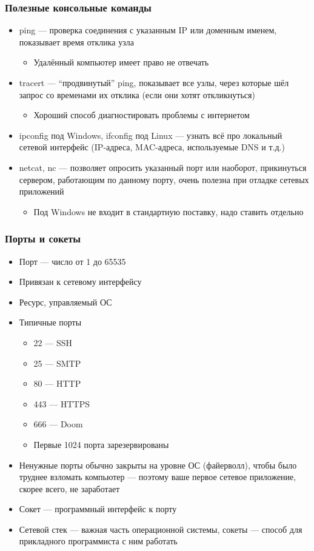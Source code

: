 \documentclass[xetex,mathserif,serif]{beamer}
\begin{document}
	\begin{frame}
		\frametitle{Полезные консольные команды}
		\begin{itemize}
			\item ping --- проверка соединения с указанным IP или доменным именем, показывает время отклика узла
			\begin{itemize}
				\item Удалённый компьютер имеет право не отвечать
			\end{itemize}
			\item tracert --- ``продвинутый'' ping, показывает все узлы, через которые шёл запрос со временами их отклика (если они хотят откликнуться)
			\begin{itemize}
				\item Хороший способ диагностировать проблемы с интернетом
			\end{itemize}
			\item ipconfig под Windows, ifconfig под Linux --- узнать всё про локальный сетевой интерфейс (IP-адреса, MAC-адреса, используемые DNS и т.д.)
			\item netcat, nc --- позволяет опросить указанный порт или наоборот, прикинуться сервером, работающим по данному порту, очень полезна при отладке сетевых приложений
			\begin{itemize}
				\item Под Windows не входит в стандартную поставку, надо ставить отдельно
			\end{itemize}
		\end{itemize}
	\end{frame}

	\begin{frame}
		\frametitle{Порты и сокеты}
		\begin{itemize}
			\item Порт --- число от 1 до 65535
			\item Привязан к сетевому интерфейсу
			\item Ресурс, управляемый ОС
			\item Типичные порты
			\begin{itemize}
				\item 22 --- SSH
				\item 25 --- SMTP
				\item 80 --- HTTP
				\item 443 --- HTTPS
				\item 666 --- Doom
				\item Первые 1024 порта зарезервированы
			\end{itemize}
			\item Ненужные порты обычно закрыты на уровне ОС (файерволл), чтобы было труднее взломать компьютер --- поэтому ваше первое сетевое приложение, скорее всего, не заработает
			\item Сокет --- программный интерфейс к порту
			\item Сетевой стек --- важная часть операционной системы, сокеты --- способ для прикладного программиста с ним работать
		\end{itemize}
	\end{frame}
\end{document}
